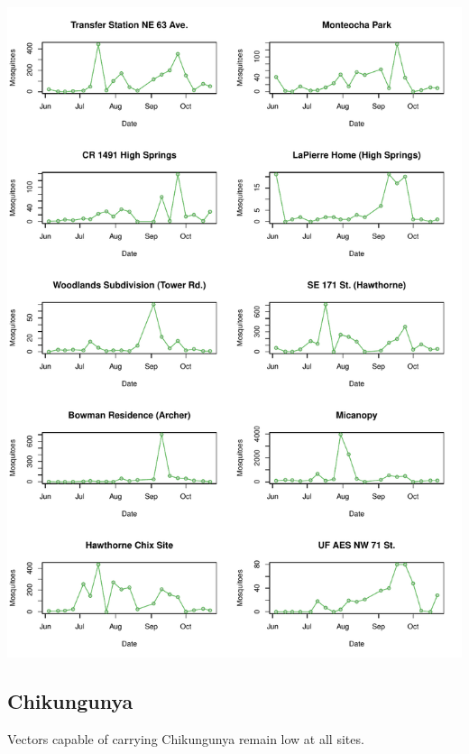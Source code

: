 \documentclass{article}
\begin{document}
\begin{center}
\includegraphics{mosq28oct13-010}
\newpage
\subsection*{Chikungunya}

\end{center}

Vectors capable of carrying Chikungunya remain low at all sites.\\
\end{document}
